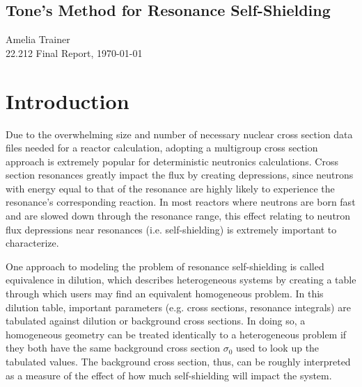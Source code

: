 \documentclass[10pt]{article}
\renewcommand{\title}[1]{\textbf{#1}\\}
\renewcommand{\line}{\begin{tabularx}{\textwidth}{X>{\raggedleft}X}\hline\\\end{tabularx}\\[-0.5cm]}
\newcommand{\leftright}[2]{\begin{tabularx}{\textwidth}{X>{\raggedleft}X}#1%
\end{tabularx}\\[-0.5cm]}
\begin{document}

\begin{center}\section*{Tone's Method for Resonance Self-Shielding}

  Amelia Trainer \\
  22.212 Final Report, \today
\end{center}
\section{Introduction}
Due to the overwhelming size and number of necessary nuclear cross section data files needed for a reactor calculation, adopting a multigroup cross section approach is extremely popular for deterministic neutronics calculations. Cross section resonances greatly impact the flux by creating depressions, since neutrons with energy equal to that of the resonance are highly likely to experience the resonance's corresponding reaction. In most reactors where neutrons are born fast and are slowed down through the resonance range, this effect relating to neutron flux depressions near resonances (i.e. self-shielding) is extremely important to characterize.\par
One approach to modeling the problem of resonance self-shielding is called equivalence in dilution, which describes heterogeneous systems by creating a table through which users may find an equivalent homogeneous problem. In this dilution table, important parameters (e.g. cross sections, resonance integrals) are tabulated against dilution or background cross sections. In doing so, a homogeneous geometry can be treated identically to a heterogeneous problem if they both have the same background cross section $\sigma_0$ used to look up the tabulated values. The background cross section, thus, can be roughly interpreted as a measure of the effect of how much self-shielding will impact the system. \par
\end{document}
